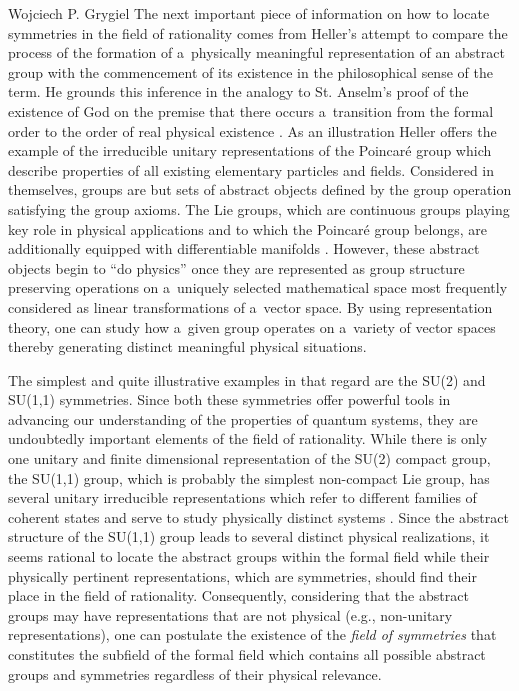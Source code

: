 \begin{artengenv}{Wojciech P. Grygiel}
The next important piece of information on how to locate symmetries in the field of rationality comes from Heller's attempt to compare the process of the formation of a~physically meaningful representation of an abstract group with the commencement of its existence in the philosophical sense of the term. He grounds this inference in the analogy to St. Anselm's proof of the existence of God on the premise that there occurs a~transition from the formal order to the order of real physical existence 
\parencite[][p.63]{heller_teilhards_2003}. %
 As an illustration Heller offers the example of the irreducible unitary representations of the Poincaré group which describe properties of all existing elementary particles and fields. Considered in themselves, groups are but sets of abstract objects defined by the group operation satisfying the group axioms. The Lie groups, which are continuous groups playing key role in physical applications and to which the Poincaré group belongs, are additionally equipped with differentiable manifolds 
\parencite[e.g.,][pp.47–54]{schwichtenberg_physics_2018}. %
 However, these abstract objects begin to ``do physics'' once they are represented as group structure preserving operations on a~uniquely selected mathematical space most frequently considered as linear transformations of a~vector space. By using representation theory, one can study how a~given group operates on a~variety of vector spaces thereby generating distinct meaningful physical situations.



The simplest and quite illustrative examples in that regard are the SU(2) and SU(1,1) symmetries. Since both these symmetries offer powerful tools in advancing our understanding of the properties of quantum systems, they are undoubtedly important elements of the field of rationality. While there is only one unitary and finite dimensional representation of the SU(2) compact group, the SU(1,1) group, which is probably the simplest non-compact Lie group, has several unitary irreducible representations which refer to different families of coherent states and serve to study physically distinct systems 
\parencite[e.g.,][]{vourdas_analytic_2006}. %
 Since the abstract structure of the SU(1,1) group leads to several distinct physical realizations, it seems rational to locate the abstract groups within the formal field while their physically pertinent representations, which are symmetries, should find their place in the field of rationality. Consequently, considering that the abstract groups may have representations that are not physical (e.g., non-unitary representations), one can postulate the existence of the \textit{field of symmetries} that constitutes the subfield of the formal field which contains all possible abstract groups and symmetries regardless of their physical relevance.




\end{artengenv}
